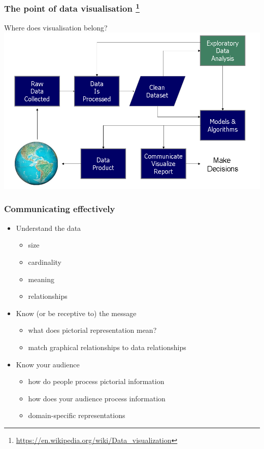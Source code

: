 \begin{frame}
  \frametitle{The point of data visualisation
  \footnote{\tiny{\href{https://en.wikipedia.org/wiki/Data_visualization}{https://en.wikipedia.org/wiki/Data\_visualization}}}
  }
    \textcolor{hutton_green}{Where does visualisation belong?}
    \includegraphics[width=\textwidth]{images/decisions}
\end{frame}


\begin{frame}
  \frametitle{Communicating effectively}
      \begin{itemize}  
        \item <1->\textcolor{hutton_green}{Understand the data}
        \begin{itemize}
          \item <2->size
          \item <2->cardinality
          \item <2->meaning
          \item <2->relationships
        \end{itemize}
        \item <1->\textcolor{hutton_blue}{Know (or be receptive to) the message}
        \begin{itemize}
          \item <3->what does pictorial representation mean?
          \item <3->match graphical relationships to data relationships
        \end{itemize}
        \item <1->\textcolor{hutton_purple}{Know your audience}
        \begin{itemize}
          \item <4->how do people process pictorial information
          \item <4->how does your audience process information
          \item <4->domain-specific representations
        \end{itemize}
      \end{itemize}  
\end{frame}



